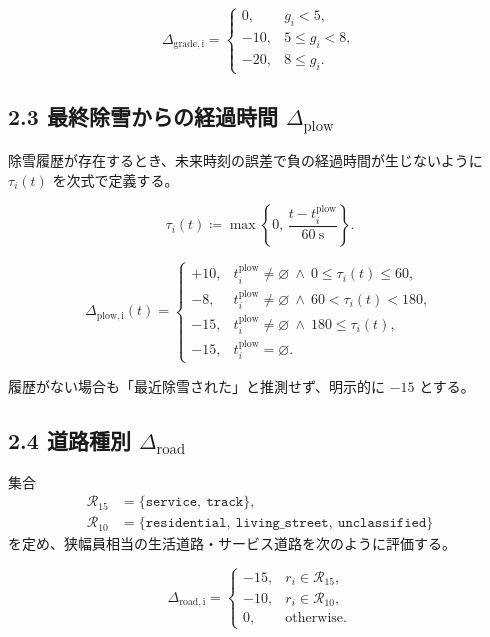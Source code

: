 \documentclass[11pt,a4paper]{article}
\newcommand{\missing}{\varnothing}
\newcommand{\factor}[1]{\Delta_{\mathrm{#1}}}
\newcommand{\code}[1]{\texttt{#1}}
\begin{document}
\begin{equation}
\factor{grade,i}=
\begin{cases}
  0,   & g_i<5,\\
  -10, & 5\le g_i<8,\\
  -20, & 8\le g_i.
\end{cases}
\end{equation}

\subsection*{2.3 最終除雪からの経過時間 $\factor{plow}$}

除雪履歴が存在するとき、未来時刻の誤差で負の経過時間が生じないように
$\tau_i(t)$ を次式で定義する。

\begin{equation}
\tau_i(t) \coloneqq
\max\!\left\{0,\,\frac{t-t_i^{\mathrm{plow}}}{60\ \mathrm{s}}\right\}.
\end{equation}

\begin{equation}
\factor{plow,i}(t)=
\begin{cases}
  +10, & t_i^{\mathrm{plow}}\ne\missing \ \land\ 0\le\tau_i(t)\le60,\\
  -8,  & t_i^{\mathrm{plow}}\ne\missing \ \land\ 60<\tau_i(t)<180,\\
  -15, & t_i^{\mathrm{plow}}\ne\missing \ \land\ 180\le\tau_i(t),\\
  -15, & t_i^{\mathrm{plow}}=\missing.
\end{cases}
\end{equation}

履歴がない場合も「最近除雪された」と推測せず、明示的に $-15$ とする。

\subsection*{2.4 道路種別 $\factor{road}$}

集合
\begin{align}
\mathcal{R}_{15} &= \{\code{service},\ \code{track}\},\\
\mathcal{R}_{10} &= \{\code{residential},\ \code{living\_street},\ \code{unclassified}\}
\end{align}
を定め、狭幅員相当の生活道路・サービス道路を次のように評価する。

\begin{equation}
\factor{road,i}=
\begin{cases}
  -15, & r_i\in\mathcal{R}_{15},\\
  -10, & r_i\in\mathcal{R}_{10},\\
  0,   & \text{otherwise}.
\end{cases}
\end{equation}
\end{document}
